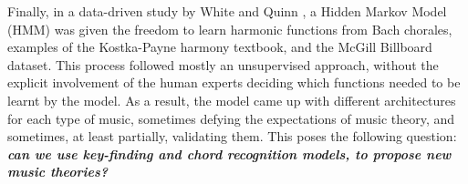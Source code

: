 Finally, in a data-driven study by White and Quinn \cite{white_chord_2018}, a Hidden Markov Model (HMM) was given the freedom to learn harmonic functions from Bach chorales, examples of the Kostka-Payne harmony textbook, and the McGill Billboard dataset. This process followed mostly an unsupervised approach, without the explicit involvement of the human experts deciding which functions needed to be learnt by the model. As a result, the model came up with different architectures for each type of music, sometimes defying the expectations of music theory, and sometimes, at least partially, validating them. This poses the following question: \textbf{\emph{can we use key-finding and chord recognition models, to propose new music theories?}}


